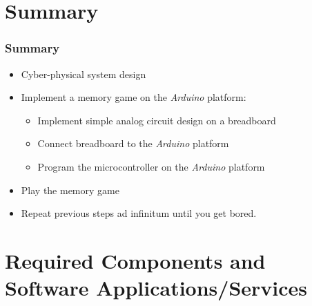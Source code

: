 \documentclass[xcolor={usenames,dvipsnames},hyperref={hyperindex,bookmarks}]{beamer}
\begin{document}
\section{Summary}

\frame
{
	\frametitle{Summary}

	\begin{itemize}
	\item Cyber-physical system design
	\item Implement a memory game on the {\it Arduino} platform: %
		\begin{itemize} %
		\item Implement simple analog circuit design on a breadboard
		\item Connect breadboard to the {\it Arduino} platform
		\item Program the microcontroller on the {\it Arduino} platform
		\end{itemize}
	\item Play the memory game
	\item Repeat previous steps ad infinitum until you get bored.
	\end{itemize}
}









\section{Required Components and Software Applications/Services}
\end{document}
